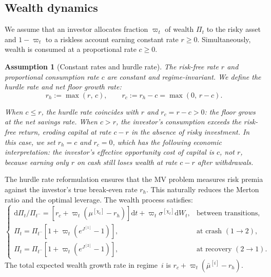 \documentclass[11pt,a4paper]{article}
\numberwithin{equation}{section}
\newtheorem{assumption}[theorem]{Assumption}
\newcommand{\dd}{\mathrm{d}}
\begin{document}
\subsection{Wealth dynamics}\label{sec:wealth}

We assume that an investor allocates fraction $\varpi_t$ of wealth $\Pi_t$ to the risky asset and $1 - \varpi_t$ to a riskless account earning constant rate $r \geq 0$. Simultaneously, wealth is consumed at a proportional rate $c \geq 0$.

\begin{assumption}[Constant rates and hurdle rate]\label{ass:r_constant}
The risk-free rate $r$ and proportional consumption rate $c$ are constant and regime-invariant.  We define the hurdle rate and net floor growth rate:
\begin{equation}\label{eq:hurdle}
r_h := \max(r,\, c), \qquad r_c := r_h - c = \max(0,\, r - c).
\end{equation}

When $c \leq r$, the hurdle rate coincides with $r$ and $r_c = r - c > 0$: the floor grows at the net savings rate.  When $c > r$, the investor's consumption exceeds the risk-free return, eroding capital at rate $c - r$ in the absence of risky investment.  In this case, we set $r_h = c$ and $r_c = 0$, which has the following economic interpretation: the investor's effective opportunity cost of capital is $c$, not $r$, because earning only $r$ on cash still loses wealth at rate $c - r$ after withdrawals.
\end{assumption}


The hurdle rate reformulation ensures that the MV problem measures risk premia against the investor's true break-even rate $r_h$. This naturally reduces the Merton ratio and the optimal leverage. The wealth process satisfies:
\begin{equation}\label{eq:wealth_sde}
\begin{cases}
\dd \Pi_t / \Pi_{t^-} = [r_c + \varpi_t (\mu^{[\chi_t]} - r_h)] \dd t + \varpi_t \sigma^{[\chi_t]} \dd W_t, & \text{between transitions,} \\[4pt]
\Pi_t = \Pi_{t^-} [1 + \varpi_t (e^{J^{[1]}} - 1)], & \text{at crash } (1 \to 2), \\[4pt]
\Pi_t = \Pi_{t^-} [1 + \varpi_t (e^{J^{[2]}} - 1)], & \text{at recovery } (2 \to 1).
\end{cases}
\end{equation}
The total expected wealth growth rate in regime~$i$ is $r_c + \varpi_t(\bar{\mu}^{[i]} - r_h)$.
\end{document}

